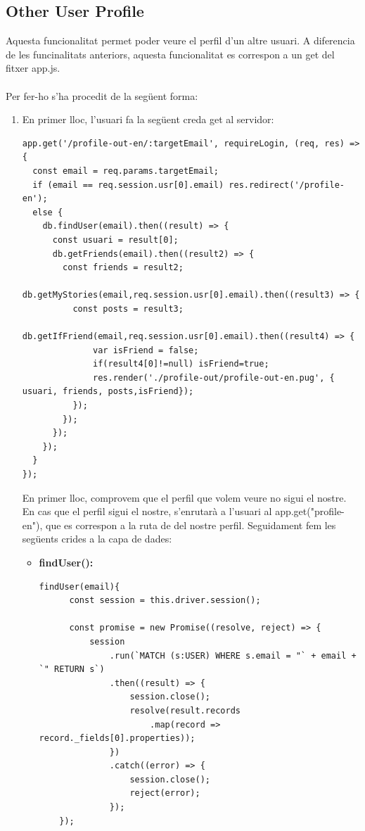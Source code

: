 \documentclass[11pt,catalan,listoffigures,listoftables]{tfgetsinf}
\begin{document}
\subsection{Other User Profile}
Aquesta funcionalitat permet poder veure el perfil d'un altre usuari. A diferencia de les funcinalitats anteriors, aquesta funcionalitat es correspon a un get del fitxer app.js.\\ \\
Per fer-ho s'ha procedit de la següent forma:
\begin{enumerate}
\item En primer lloc, l'usuari fa la següent creda get al servidor:
\begin{lstlisting}
app.get('/profile-out-en/:targetEmail', requireLogin, (req, res) => {
  const email = req.params.targetEmail;
  if (email == req.session.usr[0].email) res.redirect('/profile-en');
  else {
    db.findUser(email).then((result) => {
      const usuari = result[0];
      db.getFriends(email).then((result2) => {
        const friends = result2;
        db.getMyStories(email,req.session.usr[0].email).then((result3) => {
          const posts = result3;
          db.getIfFriend(email,req.session.usr[0].email).then((result4) => {
              var isFriend = false;
              if(result4[0]!=null) isFriend=true;
              res.render('./profile-out/profile-out-en.pug', { usuari, friends, posts,isFriend});
          });
        });
      });
    });
  }
});
\end{lstlisting}
En primer lloc, comprovem que el perfil que volem veure no sigui el nostre. En cas que el perfil sigui el nostre, s'enrutarà a l'usuari al app.get("profile-en"), que es correspon a la ruta de del nostre perfil. Seguidament fem les següents crides a la capa de dades:
\begin{itemize}
\item \textbf{findUser():}
\begin{lstlisting}
findUser(email){
      const session = this.driver.session();

      const promise = new Promise((resolve, reject) => {
          session
              .run(`MATCH (s:USER) WHERE s.email = "` + email + `" RETURN s`)
              .then((result) => {
                  session.close();
                  resolve(result.records
                      .map(record => record._fields[0].properties));
              })
              .catch((error) => {
                  session.close();
                  reject(error);
              });
    });


\end{lstlisting}
\end{itemize}
\end{enumerate}
\end{document}

